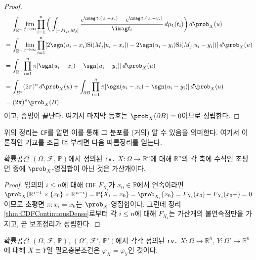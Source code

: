 \begin{proof}
\begin{align*}
        &=\int_{\mathbb{R}^n}\lim_{j\to\infty}\prod_{i=1}^n\bigg(\int_{[-M_j,\,M_j]}\frac{e^{\imag\,t_i(u_i-x_i)}-e^{\imag\,t_i(u_i-y_i)}}{\imag t_i}\,d\mu_1(t_i)\bigg)\,d\prob_X(u)\\
        &=\int_{\mathbb{R}^n}\lim_{j\to\infty}\prod_{i=1}^n[2\sgn(u_i-x_i)\mathrm{Si}(M_j|u_i-x_i|)-2\sgn(u_i-y_i)\mathrm{Si}(M_j|u_i-y_i|)]\,d\prob_X(u)\\
        &=\int_{\mathbb{R}^n}\prod_{i=1}^n\pi[\sgn(u_i-x_i)-\sgn(u_i-y_i)]\,d\prob_X(u)\\
        &=\int_{B^\circ}(2\pi)^n\,d\prob_X(u)+\int_{\partial B}\prod_{i=1}^n\pi[\sgn(u_i-x_i)-\sgn(u_i-y_i)]\,d\prob_X(u)\\
        &=(2\pi)^n\prob_X(B)
    \end{align*}
    이고, 증명이 끝난다. 여기서 마지막 등호는 $\prob_X(\partial B)=0$이므로 성립한다.
\end{proof}

위의 정리는 \texttt{CF}를 알면 이를 통해 그 분포를 (거의) 알 수 있음을 의미한다. 여기서 이론적인 기교를 조금 더 부리면 다음 따름정리를 얻는다.

\begin{lemma}
    확률공간 $(\Omega,\,\mathcal{F},\,\mathbb{P})$에서 정의된 \texttt{rv.} $X:\Omega\to\mathbb{R}^n$에 대해 $\mathbb{R}^n$의 각 축에 수직인 초평면 중에 $\prob_X$-영집합이 아닌 것은 가산개이다.
\end{lemma}

\begin{proof}
    임의의 $i\leq n$에 대해 \texttt{CDF} $F_{X_i}$가 $x_0\in\mathbb{R}$에서 연속이라면 $\prob_X(\mathbb{R}^{i-1}\times\{x_0\}\times\mathbb{R}^{n-i})=\mathbb{P}\{X_i=x_0\}=\prob_{X_i}\{x_0\}=F_{X_i}(x_0)-F_{X_i}(x_0-)=0$이므로 초평면 $\pi:x_i=x_0$는 $\prob_X$-영집합이다. 그런데 정리 \ref{thm:CDFContinuousDense}로부터 각 $i\leq n$에 대해 $F_{X_i}$는 가산개의 불연속점만을 가지고, 곧 보조정리가 성립한다.
\end{proof}

\begin{corollary}\label{cor:CFEquivalent}
    확률공간 $(\Omega,\,\mathcal{F},\,\mathbb{P}),\,(\Omega',\,\mathcal{F}',\,\mathbb{P}')$에서 각각 정의된 \texttt{rv.} $X:\Omega\to\mathbb{R}^n,\,Y:\Omega'\to\mathbb{R}^n$에 대해 $X\equiv Y$일 필요충분조건은 $\varphi_X=\varphi_Y$인 것이다.
\end{corollary}

